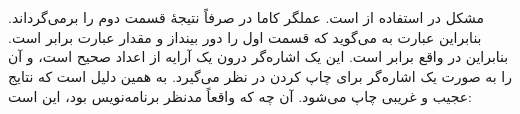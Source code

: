 \section{}
\paragraph{}\label{answer:86}
 مشکل در استفاده از  است. عملگر کاما در  صرفاً نتیجهٔ قسمت دوم را برمی‌گرداند. بنابراین عبارت  به  می‌گوید که قسمت اول  را دور بینداز و مقدار عبارت برابر  است. بنابراین  در واقع برابر  است. این یک اشاره‌گر درون یک آرایه از اعداد صحیح است، و  آن را به صورت یک اشاره‌گر برای چاپ کردن در نظر می‌گیرد. به همین دلیل است که نتایج عجیب و غریبی چاپ می‌شود. آن چه که واقعاً مدنظر برنامه‌نویس بود، این است: 